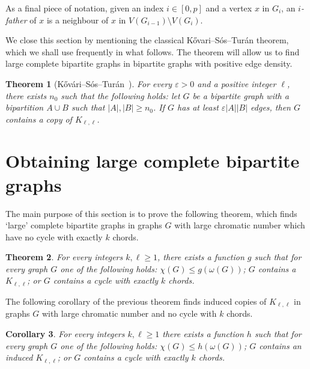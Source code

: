 \documentclass[11pt,english]{article}
\theoremstyle{plain}
\newtheorem{thm}{Theorem}[section]
\newtheorem{cor}[thm]{Corollary}
\theoremstyle{definition}
\theoremstyle{remark}
\newcommand{\eps}{\varepsilon}
\begin{document}
    As a final piece of notation, given an index $i \in [0,p]$ and a vertex $x$ in $G_i$, an \emph{$i$-father} of $x$ is a neighbour of $x$ in $V(G_{i-1}) \setminus V(G_i)$.
    
    
    We close this section by mentioning the classical K\H{o}vari--S\'os--Tur\'an theorem, which we shall use frequently in what follows.
    The theorem will allow us to find large complete bipartite graphs in bipartite graphs with positive edge density.

    \begin{thm}[K\H{o}v\'ari--S\'os--Tur\'an~\cite{KST54}] \label{thm:kovari-sos-turan}
		For every $\eps>0$ and a positive integer $\ell$, there exists $n_0$ such that the following holds:
		let $G$ be a bipartite graph with a bipartition $A\cup B$ such that $|A|, |B| \ge n_0$. If $G$ has at least $\eps |A| |B|$ edges, then $G$ contains a copy of $K_{\ell, \ell}$.
	\end{thm}

\section{Obtaining large complete bipartite graphs} \label{sec:bt}

	The main purpose of this section is to prove the following theorem, which finds `large' complete bipartite graphs in graphs $G$ with large chromatic number which have no cycle with exactly $k$ chords.
	
    \begin{thm} \label{thm:bt}
		For every integers $k, \ell \ge 1$, there exists a function $g$ such that for every graph $G$ one of the following holds: $\chi(G) \le g(\omega(G))$; $G$ contains a $K_{\ell, \ell}$; or $G$  contains a cycle with exactly $k$ chords.
	\end{thm}
	
	The following corollary of the previous theorem finds induced copies of $K_{\ell,\ell}$ in graphs $G$ with large chromatic number and no cycle with $k$ chords.
	
	\begin{cor} \label{cor:bt-induced-bip}
	    For every integers $k, \ell \ge 1$ there exists a function $h$ such that for every graph $G$ one of the following holds: $\chi(G) \le h(\omega(G))$; $G$ contains an induced $K_{\ell, \ell}$; or $G$ contains a cycle with exactly $k$ chords.
	\end{cor}
	
\end{document}
